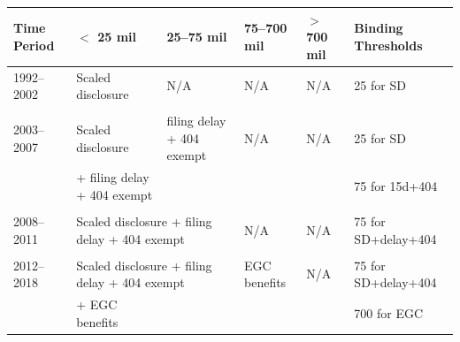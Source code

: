 \begin{centering}
	\begin{tabular*} {\linewidth}{@{\extracolsep{\fill}}llllll@{}}
		\toprule
		Time Period & $<$ 25 mil & 25--75 mil & 75--700 mil & $>$ 700 mil & Binding Thresholds \\
		\midrule
		1992--2002 & Scaled disclosure & N/A & N/A   & N/A   & 25 for SD \\
		& & & & & \\ 
		2003--2007 & Scaled disclosure &  filing delay + 404 exempt & N/A   & N/A   & 25 for SD \\
		& + filing delay + 404 exempt &  & &  & 75 for 15d+404  \\  
		& & & & & \\ 
		2008--2011 & \multicolumn{2}{p{22.325em}}{Scaled disclosure + filing delay + 404 exempt} & N/A   & N/A   & 75 for SD+delay+404  \\
		& & & & & \\ 
		2012--2018 & \multicolumn{2}{p{22.325em}}{Scaled disclosure + filing delay + 404 exempt} & EGC benefits  & N/A   & 75 for SD+delay+404 \\
		& + EGC benefits & &  &  & 700 for EGC \\
		\bottomrule
	\end{tabular*}%
	\label{tab:regulation_intervals}%
	\par
\end{centering}%